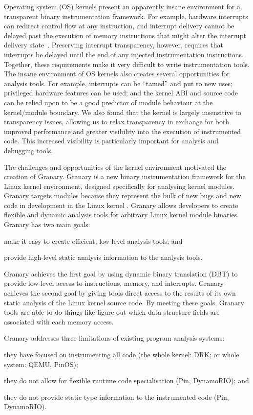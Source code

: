 \documentclass[preprint]{sigplanconf}
\begin{document}
Operating system (OS) kernels present an apparently insane environment for a transparent binary instrumentation framework.  For example, hardware interrupts can redirect control flow at any instruction, and interrupt delivery cannot be delayed past the execution of memory instructions that might alter the interrupt delivery state~\cite{DRK}. Preserving interrupt transparency, however, requires that interrupts be delayed until the end of any injected instrumentation instructions.  Together, these requirements make it very difficult to write instrumentation tools.  The insane environment of OS kernels also creates several opportunities for analysis tools. For example, interrupts can be ``tamed'' and put to new uses; privileged hardware features can be used; and the kernel ABI and source code can be relied upon to be a good predictor of module behaviour at the kernel/module boundary. We also found that the kernel is largely insensitive to transparency issues, allowing us to relax transparency in exchange for both improved performance and greater visibility into the execution of instrumented code.  This increased visibility is particularly important for analysis and debugging tools.

The challenges and opportunities of the kernel environment motivated the creation of Granary. Granary is a new binary instrumentation framework for the Linux kernel environment, designed specifically for analysing kernel modules. Granary targets modules because they represent the bulk of new bugs and new code in development in the Linux kernel \cite{FaultsInLinux}. Granary allows developers to create flexible and dynamic analysis tools for arbitrary Linux kernel module binaries. Granary has two main goals: \begin{inparaenum}[i)]
	\item make it easy to create efficient, low-level analysis tools; and
	\item provide high-level static analysis information to the analysis tools.
\end{inparaenum} Granary achieves the first goal by using dynamic binary translation (DBT) to provide low-level access to instructions, memory, and interrupts. Granary achieves the second goal by giving tools direct access to the results of its own static analysis of the Linux kernel source code. By meeting these goals, Granary tools are able to do things like  figure out which data structure fields are associated with each memory access.

Granary addresses three limitations of existing program analysis systems: \begin{inparaenum}[i)]
	\item they have focused on instrumenting all code (the whole kernel: DRK; or whole system: QEMU, PinOS);
	\item they do not allow for flexible runtime code specialisation (Pin, DynamoRIO); and
	\item they do not provide static type information to the instrumented code (Pin, DynamoRIO).
\end{inparaenum} 
\end{document}
